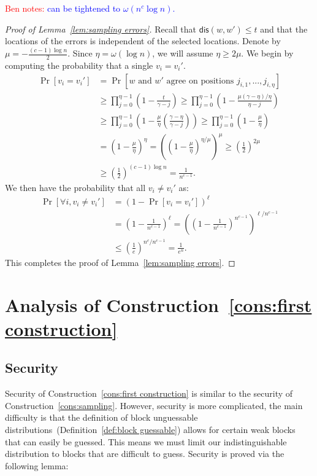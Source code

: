 \documentclass[11pt]{article}
\newcommand{\defref}[1]{\mbox{Definition~\ref{#1}}}
\newcommand{\lemref}[1]{\mbox{Lemma~\ref{#1}}}
\newcommand{\consref}[1]{\mbox{Construction~\ref{#1}}}
\newcommand{\dis}{\ensuremath{\mathsf{dis}}}
\newcommand{\authnote}[2]{{\textcolor{red}{\textsf{#1 notes: }\textcolor{blue}{ #2}}\marginpar{\textcolor{red}{\textbf{!!!!!}}}}}
\newcommand{\authnote}[2]{}
\newcommand{\bnote}[1]{{\authnote{Ben}{#1}}}
\begin{document}
\bnote{can be tightened to $\omega(n^c \log n)$.}
\begin{proof}[Proof of \lemref{lem:sampling errors}]

Recall that $\dis(w, w')\leq t$ and that the locations of the errors is independent of the selected locations.  Denote by $\mu = -\frac{(c-1)\log n}{2}$.  Since $\eta = \omega(\log n)$, we will assume
$\eta\ge 2\mu$.  We begin by computing the probability that a single $v_i = v_i'$.  
\begin{align*}
\Pr[v_i = v_i'] &= \Pr[w\text{ and }w'\text{ agree on positions }j_{i,1},..., j_{i,\eta}]\\
&\ge \prod_{j=0}^{\eta-1} \left( 1- \frac{t}{\gamma -j }\right) \ge \prod_{j=0}^{\eta-1}\left(1-\frac{\mu(\gamma-\eta)/\eta}{\eta-j}\right)\\
&\ge \prod_{j=0}^{\eta-1} \left( 1- \frac{\mu}{\eta}\left(\frac{\gamma-\eta}{\gamma -j }\right)\right)\ge \prod_{j=0}^{\eta-1}\left(1-\frac{\mu}{\eta}\right)\\
&= \left(1-\frac{\mu}{\eta}\right)^{\eta} =\left( \left(1-\frac{\mu}{\eta}\right)^{\eta/\mu}\right)^\mu\geq \left(\frac{1}{2}\right)^{2\mu}\\
&\ge \left(\frac{1}{2}\right)^{(c-1) \log n}= \frac{1}{n^{c-1}}.
\end{align*}
We then have the probability that all $v_i\neq v_i'$ as:
\begin{align*}
\Pr[\forall i, v_i \neq v_i'] &= \left(1-\Pr[v_i= v_i']\right)^\ell\\
&=\left( 1- \frac{1}{n^{c-1}}\right)^\ell =\left(\left( 1- \frac{1}{n^{c-1}}\right)^{n^{c-1}}\right)^{\ell /n^{c-1}}\\
&\le \left(\frac{1}{e}\right)^{n^c/n^{c-1}} = \frac{1}{e^n}.
\end{align*}
This completes the proof of \lemref{lem:sampling errors}.
\end{proof}


\section{Analysis of \consref{cons:first construction}}
\label{sec:construction analysis}
\subsection{Security}
Security of \consref{cons:first construction} is similar to the security of \consref{cons:sampling}.  However, security is more complicated, the main difficulty is that the definition of block unguessable distributions~(\defref{def:block guessable}) allows for certain weak blocks that can easily be guessed.  This means we must limit our indistinguishable distribution to blocks that are difficult to guess.  Security is proved via the following lemma:
\end{document}

